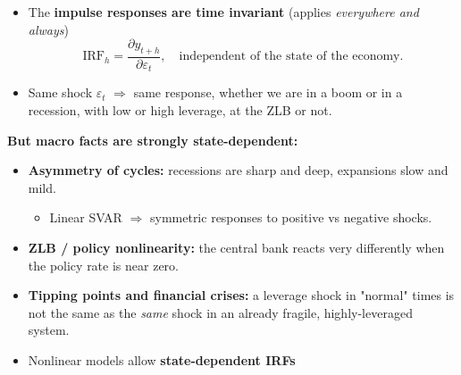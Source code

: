 \documentclass{beamer}
\begin{document}
\begin{frame}{}
\small

\begin{itemize}
  \item The \textbf{impulse responses are time invariant} (applies
        \emph{everywhere and always})
        \[
          \text{IRF}_h = \frac{\partial y_{t+h}}{\partial \varepsilon_t},
          \quad \text{independent of the state of the economy.}
        \]
  \item Same shock $\varepsilon_t$ $\Rightarrow$ same response, whether we are
        in a boom or in a recession, with low or high leverage, at the ZLB or not.
\end{itemize}

\pause
\textbf{But macro facts are strongly state-dependent:}
\begin{itemize}
  \item \textbf{Asymmetry of cycles:} recessions are sharp and deep,
        expansions slow and mild.
        \begin{itemize}
          \item Linear SVAR $\Rightarrow$ symmetric responses to positive vs negative shocks.
        \end{itemize}
  \item \textbf{ZLB / policy nonlinearity:} the central bank reacts very
        differently when the policy rate is near zero.
  \item \textbf{Tipping points and financial crises:} a leverage shock in
        "normal" times is not the same as the \emph{same} shock in an already
        fragile, highly-leveraged system.
\end{itemize}

\begin{itemize}
  \item Nonlinear models allow \textbf{state-dependent IRFs}
\end{itemize}

\end{frame}
\end{document}
